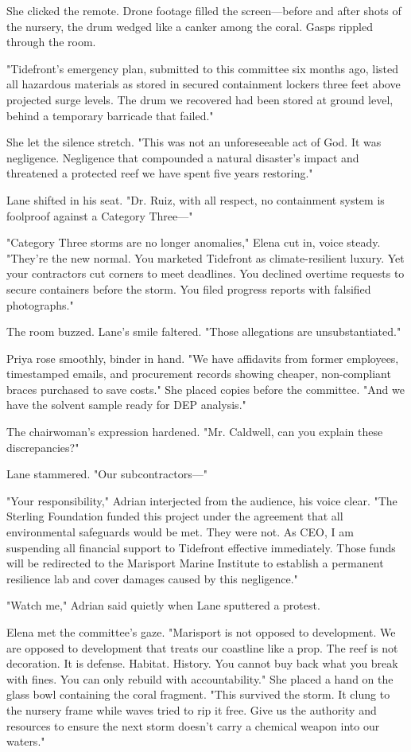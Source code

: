 She clicked the remote. Drone footage filled the screen—before and after shots of the nursery, the drum wedged like a canker among the coral. Gasps rippled through the room.

"Tidefront's emergency plan, submitted to this committee six months ago, listed all hazardous materials as stored in secured containment lockers three feet above projected surge levels. The drum we recovered had been stored at ground level, behind a temporary barricade that failed."

She let the silence stretch. "This was not an unforeseeable act of God. It was negligence. Negligence that compounded a natural disaster's impact and threatened a protected reef we have spent five years restoring."

Lane shifted in his seat. "Dr. Ruiz, with all respect, no containment system is foolproof against a Category Three—"

"Category Three storms are no longer anomalies," Elena cut in, voice steady. "They're the new normal. You marketed Tidefront as climate-resilient luxury. Yet your contractors cut corners to meet deadlines. You declined overtime requests to secure containers before the storm. You filed progress reports with falsified photographs."

The room buzzed. Lane's smile faltered. "Those allegations are unsubstantiated."

Priya rose smoothly, binder in hand. "We have affidavits from former employees, timestamped emails, and procurement records showing cheaper, non-compliant braces purchased to save costs." She placed copies before the committee. "And we have the solvent sample ready for DEP analysis."

The chairwoman's expression hardened. "Mr. Caldwell, can you explain these discrepancies?"

Lane stammered. "Our subcontractors—"

"Your responsibility," Adrian interjected from the audience, his voice clear. "The Sterling Foundation funded this project under the agreement that all environmental safeguards would be met. They were not. As CEO, I am suspending all financial support to Tidefront effective immediately. Those funds will be redirected to the Marisport Marine Institute to establish a permanent resilience lab and cover damages caused by this negligence."

"Watch me," Adrian said quietly when Lane sputtered a protest.

Elena met the committee's gaze. "Marisport is not opposed to development. We are opposed to development that treats our coastline like a prop. The reef is not decoration. It is defense. Habitat. History. You cannot buy back what you break with fines. You can only rebuild with accountability." She placed a hand on the glass bowl containing the coral fragment. "This survived the storm. It clung to the nursery frame while waves tried to rip it free. Give us the authority and resources to ensure the next storm doesn't carry a chemical weapon into our waters."

